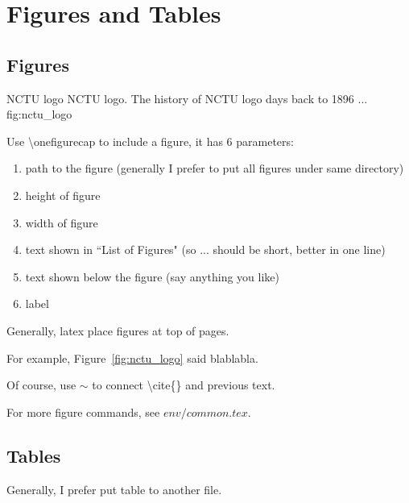 \chapter{Figures and Tables}

\section{Figures}

{NCTU logo}
{NCTU logo. The history of NCTU logo days back to 1896 ...}
{fig:nctu_logo}

Use \textbackslash onefigurecap to include a figure, it has 6 parameters:
\begin{enumerate}
\item path to the figure (generally I prefer to put all figures under same directory)
\item height of figure
\item width of figure
\item text shown in ``List of Figures" (so ... should be short, better in one line)
\item text shown below the figure (say anything you like)
\item label
\end{enumerate}

Generally, latex place figures at top of pages.

For example, Figure~\ref{fig:nctu_logo} said blablabla.

Of course, use $\sim$ to connect \textbackslash cite\{\} and previous text.

For more figure commands, see $env/common.tex$.

\section{Tables}

Generally, I prefer put table to another file.


